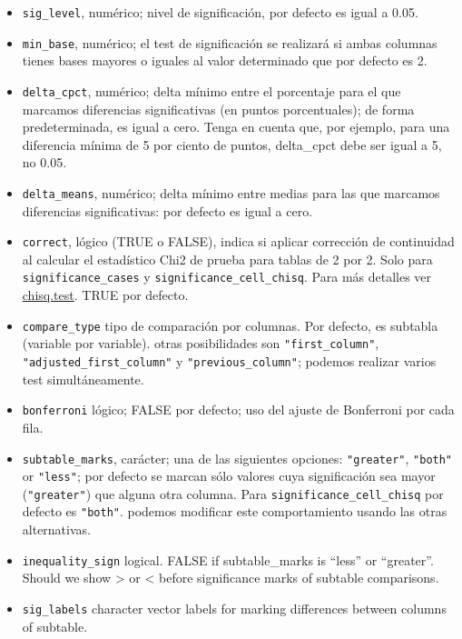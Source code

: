 \documentclass[
]{book}
\providecommand{\tightlist}{%
  \setlength{\itemsep}{0pt}\setlength{\parskip}{0pt}}
\begin{document}
\begin{itemize}
\tightlist
\item
  \texttt{sig\_level}, numérico; nivel de significación, por defecto es igual a 0.05.
\item
  \texttt{min\_base}, numérico; el test de significación se realizará si ambas columnas tienes bases mayores o iguales al valor determinado que por defecto es 2.
\item
  \texttt{delta\_cpct}, numérico; delta mínimo entre el porcentaje para el que marcamos diferencias significativas (en puntos porcentuales); de forma predeterminada, es igual a cero. Tenga en cuenta que, por ejemplo, para una diferencia mínima de 5 por ciento de puntos, delta\_cpct debe ser igual a 5, no 0.05.
\item
  \texttt{delta\_means}, numérico; delta mínimo entre medias para las que marcamos diferencias significativas: por defecto es igual a cero.
\item
  \texttt{correct}, lógico (TRUE o FALSE), indica si aplicar corrección de continuidad al calcular el estadístico Chi2 de prueba para tablas de 2 por 2. Solo para \texttt{significance\_cases} y \texttt{significance\_cell\_chisq}. Para más detalles ver \href{https://www.rdocumentation.org/packages/stats/versions/3.6.2/topics/chisq.test}{chisq.test}. TRUE por defecto.
\item
  \texttt{compare\_type} tipo de comparación por columnas. Por defecto, es subtabla (variable por variable). otras posibilidades son \texttt{"first\_column"}, \texttt{"adjusted\_first\_column"} y \texttt{"previous\_column"}; podemos realizar varios test simultáneamente.
\item
  \texttt{bonferroni} lógico; FALSE por defecto; uso del ajuste de Bonferroni por cada fila.
\item
  \texttt{subtable\_marks}, carácter; una de las siguientes opciones: \texttt{"greater"}, \texttt{"both"} or \texttt{"less"}; por defecto se marcan sólo valores cuya significación sea mayor (\texttt{"greater"}) que alguna otra columna. Para \texttt{significance\_cell\_chisq} por defecto es \texttt{"both"}. podemos modificar este comportamiento usando las otras alternativas.
\item
  \texttt{inequality\_sign} logical. FALSE if subtable\_marks is ``less'' or ``greater''. Should we show \textgreater{} or \textless{} before significance marks of subtable comparisons.
\item
  \texttt{sig\_labels} character vector labels for marking differences between columns of subtable.

\end{itemize}
\end{document}
